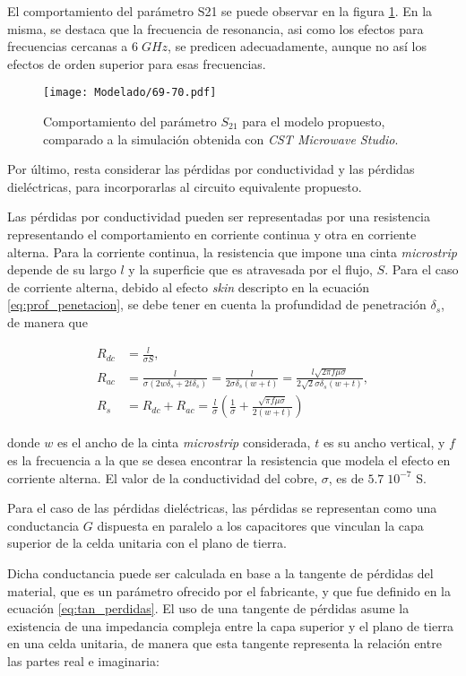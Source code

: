 El comportamiento del parámetro S21 se puede observar en la figura \ref{fig:s21-total-sin-R}. En la misma, se destaca que la frecuencia de resonancia, asi como los efectos para frecuencias cercanas a $6\; GHz$, se predicen adecuadamente, aunque no así los efectos de orden superior para esas frecuencias.

\begin{figure}[h]
	\centering
	\texttt{[image: Modelado/69-70.pdf]}
	\caption{Comportamiento del parámetro $S_{21}$ para el modelo propuesto, comparado a la simulación obtenida con \textit{CST Microwave Studio}.}
	\label{fig:s21-total-sin-R}
\end{figure}

Por último, resta considerar las pérdidas por conductividad y las pérdidas dieléctricas, para incorporarlas al circuito equivalente propuesto.

Las pérdidas por conductividad pueden ser representadas por una resistencia representando el comportamiento en corriente continua y otra en corriente alterna. Para la corriente continua, la resistencia que impone una cinta \textit{microstrip} depende de su largo $l$ y la superficie que es atravesada por el flujo, $S$. Para el caso de corriente alterna, debido al efecto \textit{skin} descripto en la ecuación \ref{eq:prof_penetacion}, se debe tener en cuenta la profundidad de penetración $\delta_s$, de manera que

\begin{align}
R_{dc} &= \frac{l}{\sigma S}, \\
R_{ac} &= \frac{l}{\sigma(2 w \delta_s+2 t \delta_s)} = \frac{l}{2\sigma \delta_s(w +t)} = \frac{l \sqrt{2 \pi f \mu \sigma}}{2 \sqrt{2}\sigma \delta_s(w +t)}, \\
R_s &= R_{dc} + R_{ac} = \frac{l}{\sigma}  \left(\frac{1}{\sigma} + \frac{\sqrt{\pi f \mu \sigma}}{2 (w+t)}\right)
\end{align}

donde $w$ es el ancho de la cinta \textit{microstrip} considerada, $t$ es su ancho vertical, y $f$ es la frecuencia a la que se desea encontrar la resistencia que modela el efecto en corriente alterna. El valor de la conductividad del cobre, $\sigma$, es de $5.7\;10^{-7}$ S.

Para el caso de las pérdidas dieléctricas, las pérdidas se representan como una conductancia $G$ dispuesta en paralelo a los capacitores que vinculan la capa superior de la celda unitaria con el plano de tierra.

Dicha conductancia puede ser calculada en base a la tangente de pérdidas del material, que es un parámetro ofrecido por el fabricante, y que fue definido en la ecuación \ref{eq:tan_perdidas}. El uso de una tangente de pérdidas asume la existencia de una impedancia compleja entre la capa superior y el plano de tierra en una celda unitaria, de manera que esta tangente representa la relación entre las partes real e imaginaria:


